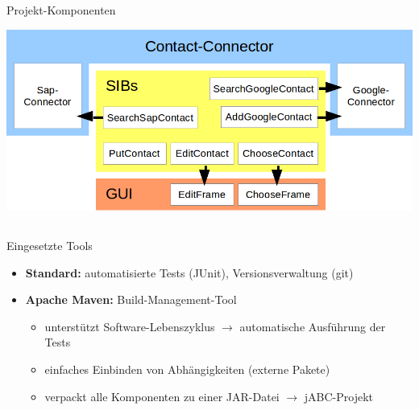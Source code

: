 \subsection*{}
\begin{frame}{Projekt-Komponenten}
	
\begin{center}
\includegraphics[width=\textheight]{Bilder/projekt_aufbau.png} 
\end{center}

\end{frame}


\subsection*{}
\begin{frame}{Eingesetzte Tools}
\begin{itemize}[<+->]
	
	\item \textbf{Standard:} automatisierte Tests (JUnit), Versionsverwaltung (git)
	\pause
	\item \textbf{Apache Maven:} Build-Management-Tool
		\begin{itemize}[<+->]
			
			\item unterstützt Software-Lebenszyklus $\rightarrow$ automatische Ausführung der Tests
			\item einfaches Einbinden von Abhängigkeiten (externe Pakete)
			\item verpackt alle Komponenten zu einer JAR-Datei $\rightarrow$ jABC-Projekt
		\end{itemize}
\end{itemize}

\end{frame}











